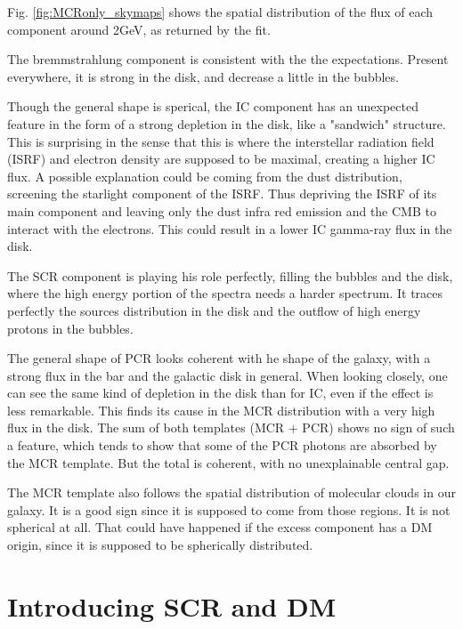 Fig. \ref{fig:MCRonly_skymaps} shows the spatial distribution of the flux of each component around 2GeV, as returned by the fit.

The bremmstrahlung component is consistent with the the expectations. Present everywhere, it is strong in the disk, and decrease a little in the bubbles.

Though the general shape is sperical, the IC component has an unexpected feature in the form of a strong depletion in the disk, like a "sandwich" structure. This is surprising in the sense that this is where the interstellar radiation field (ISRF) and electron density are supposed to be maximal, creating a higher IC flux. A possible explanation could be coming from the dust distribution, screening the starlight component of the ISRF. Thus depriving the ISRF of its main component and leaving only the dust infra red emission and the CMB to interact with the electrons. This could result in a lower IC gamma-ray flux in the disk.

The SCR component is playing his role perfectly, filling the bubbles and the disk, where the high energy portion of the spectra needs a harder spectrum. It traces perfectly the sources distribution in the disk and the outflow of high energy protons in the bubbles.

The general shape of PCR looks coherent with he shape of the galaxy, with a strong flux in the bar and the galactic disk in general. When looking closely, one can see the same kind of depletion in the disk than for IC, even if the effect is less remarkable. This finds its cause in the MCR distribution with a very high flux in the disk. The sum of both templates (MCR + PCR) shows no sign of such a feature, which tends to show that some of the PCR photons are absorbed by the MCR template. But the total is coherent, with no unexplainable central gap.

The MCR template also follows the spatial distribution of molecular clouds in our galaxy. It is a good sign since it is supposed to come from those regions.
It is not spherical at all. That could have happened if the excess component has a DM origin, since it is supposed to be spherically distributed.


\section{Introducing SCR and DM}

